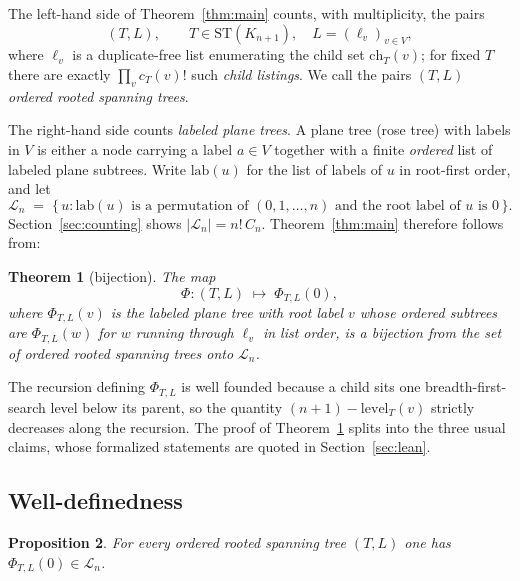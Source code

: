 \documentclass[11pt]{article}
\newtheorem{theorem}{Theorem}[section]
\newtheorem{proposition}[theorem]{Proposition}
\theoremstyle{remark}
\theoremstyle{definition}
\begin{document}
The left-hand side of Theorem~\ref{thm:main} counts, with multiplicity, the
pairs
\[
  (T, L), \qquad T \in \mathrm{ST}(K_{n+1}), \quad
  L = (\ell_v)_{v \in V},
\]
where $\ell_v$ is a duplicate-free list enumerating the child set
$\mathrm{ch}_T(v)$; for fixed $T$ there are exactly $\prod_v c_T(v)!$ such
\emph{child listings}.  We call the pairs $(T,L)$ \emph{ordered rooted
spanning trees}.

The right-hand side counts \emph{labeled plane trees}.  A plane tree (rose
tree) with labels in $V$ is either a node carrying a label $a \in V$ together
with a finite \emph{ordered} list of labeled plane subtrees.  Write
$\mathrm{lab}(u)$ for the list of labels of $u$ in root-first order, and let
\[
  \mathcal{L}_n \;=\; \{\, u :
    \mathrm{lab}(u) \text{ is a permutation of } (0,1,\dots,n)
    \text{ and the root label of } u \text{ is } 0 \,\}.
\]
Section~\ref{sec:counting} shows $|\mathcal{L}_n| = n!\,C_n$.
Theorem~\ref{thm:main} therefore follows from:

\begin{theorem}[bijection]\label{thm:bij}
The map
\[
  \Phi : (T, L) \;\longmapsto\; \Phi_{T,L}(0),
\]
where $\Phi_{T,L}(v)$ is the labeled plane tree with root label $v$ whose
ordered subtrees are $\Phi_{T,L}(w)$ for $w$ running through $\ell_v$ in list
order, is a bijection from the set of ordered rooted spanning trees onto
$\mathcal{L}_n$.
\end{theorem}

The recursion defining $\Phi_{T,L}$ is well founded because a child sits one
breadth-first-search level below its parent, so the quantity
$(n+1) - \mathrm{level}_T(v)$ strictly decreases along the recursion.  The
proof of Theorem~\ref{thm:bij} splits into the three usual claims, whose
formalized statements are quoted in Section~\ref{sec:lean}.

\subsection{Well-definedness}

\begin{proposition}\label{prop:welldef}
For every ordered rooted spanning tree $(T,L)$ one has
$\Phi_{T,L}(0) \in \mathcal{L}_n$.
\end{proposition}
\end{document}
